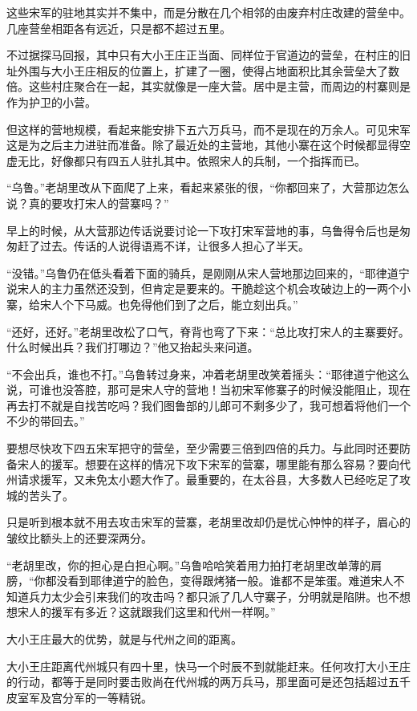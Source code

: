 这些宋军的驻地其实并不集中，而是分散在几个相邻的由废弃村庄改建的营垒中。几座营垒相距各有远近，只是都不超过五里。

不过据探马回报，其中只有大小王庄正当面、同样位于官道边的营垒，在村庄的旧址外围与大小王庄相反的位置上，扩建了一圈，使得占地面积比其余营垒大了数倍。这些村庄聚合在一起，其实就像是一座大营。居中是主营，而周边的村寨则是作为护卫的小营。

但这样的营地规模，看起来能安排下五六万兵马，而不是现在的万余人。可见宋军这是为之后主力进驻而准备。除了最近处的主营地，其他小寨在这个时候都显得空虚无比，好像都只有四五人驻扎其中。依照宋人的兵制，一个指挥而已。

“乌鲁。”老胡里改从下面爬了上来，看起来紧张的很，“你都回来了，大营那边怎么说？真的要攻打宋人的营寨吗？”

早上的时候，从大营那边传话说要讨论一下攻打宋军营地的事，乌鲁得令后也是匆匆赶了过去。传话的人说得语焉不详，让很多人担心了半天。

“没错。”乌鲁仍在低头看着下面的骑兵，是刚刚从宋人营地那边回来的，“耶律道宁说宋人的主力虽然还没到，但肯定是要来的。干脆趁这个机会攻破边上的一两个小寨，给宋人个下马威。也免得他们到了之后，能立刻出兵。”

“还好，还好。”老胡里改松了口气，脊背也弯了下来：“总比攻打宋人的主寨要好。什么时候出兵？我们打哪边？”他又抬起头来问道。

“不会出兵，谁也不打。”乌鲁转过身来，冲着老胡里改笑着摇头：“耶律道宁他这么说，可谁也没答腔，那可是宋人守的营地！当初宋军修寨子的时候没能阻止，现在再去打不就是自找苦吃吗？我们图鲁部的儿郎可不剩多少了，我可想着将他们一个不少的带回去。”

要想尽快攻下四五宋军把守的营垒，至少需要三倍到四倍的兵力。与此同时还要防备宋人的援军。想要在这样的情况下攻下宋军的营寨，哪里能有那么容易？要向代州请求援军，又未免太小题大作了。最重要的，在太谷县，大多数人已经吃足了攻城的苦头了。

只是听到根本就不用去攻击宋军的营寨，老胡里改却仍是忧心忡忡的样子，眉心的皱纹比额头上的还要深两分。

“老胡里改，你的担心是白担心啊。”乌鲁哈哈笑着用力拍打老胡里改单薄的肩膀，“你都没看到耶律道宁的脸色，变得跟烤猪一般。谁都不是笨蛋。难道宋人不知道兵力太少会引来我们的攻击吗？都只派了几人守寨子，分明就是陷阱。也不想想宋人的援军有多近？这就跟我们这里和代州一样啊。”

大小王庄最大的优势，就是与代州之间的距离。

大小王庄距离代州城只有四十里，快马一个时辰不到就能赶来。任何攻打大小王庄的行动，都等于是同时要击败尚在代州城的两万兵马，那里面可是还包括超过五千皮室军及宫分军的一等精锐。

